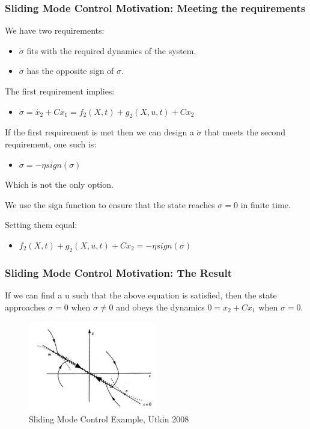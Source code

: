 \documentclass[aspectratio=169]{beamer}
\begin{document}
\begin{frame}
    \frametitle{Sliding Mode Control Motivation: Meeting the requirements}
    We have two requirements:
    \begin{itemize}
        \item $\dot{\sigma}$ fits with the required dynamics of the system.
        \item $\dot{\sigma}$ has the opposite sign of $\sigma$.
    \end{itemize}
    
    The first requirement implies:
    \begin{itemize}
        \item $\dot{\sigma}=\dot{x_2}+C\dot{x_1}=f_2(X,t)+g_2(X,u,t)+Cx_2$
    \end{itemize}
    
    If the first requirement is met then we can design a $\dot{\sigma}$ that meets the second requirement, one such is:
    \begin{itemize}
        \item $\dot{\sigma}=-\eta sign(\sigma)$
    \end{itemize}
    Which is not the only option. 
    
    We use the sign function to ensure that the state reaches $\sigma=0$ in finite time.
    
    Setting them equal:
    \begin{itemize}
        \item $f_2(X,t)+g_2(X,u,t)+Cx_2=-\eta sign(\sigma)$
    \end{itemize}
    
    
\end{frame}
\begin{frame}
    \frametitle{Sliding Mode Control Motivation: The Result}
    If we can find a u such that the above equation is satisfied, then the state approaches $\sigma=0$ when $\sigma\ne0$ and obeys the dynamics $0=x_2+Cx_1$ when $\sigma=0$.
    \begin{figure}[htbp]
        \centering
        \includegraphics[width=0.5\textwidth]{Sliding Mode Figure.png}
        \caption{Sliding Mode Control Example, Utkin 2008 \cite{UtkinSMC}}
    \end{figure}
    

\end{frame}
\end{document}

